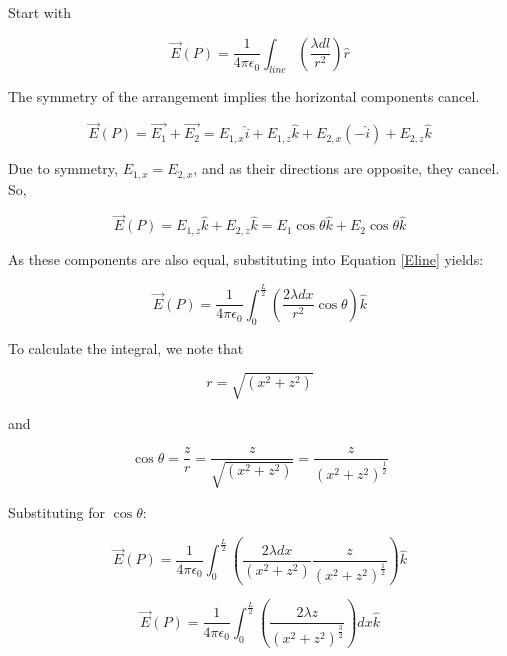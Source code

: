 \documentclass[14pt]{memoir}
\begin{document}
Start with 

\begin{equation}
\vec{E}(P) = \frac{1}{4 \pi \epsilon_0} \int_{line}(\frac{\lambda dl}{r^2})\hat{r}
\label{Eline}
\end{equation}
	
The symmetry of the arrangement implies the horizontal components cancel.

\begin{equation}
\vec{E}(P) = \vec{E_1} + \vec{E_2} = E_{1,x} \hat{i} + E_{1,z} \hat{k} + E_{2,x} (-\hat{i}) + E_{2,z} \hat{k}
\end{equation}

Due to symmetry, $E_{1,x} = E_{2,x}$, and as their directions are opposite, they cancel. So,

\begin{equation}
\vec{E}(P) = E_{1,z} \hat{k}  + E_{2,z} \hat{k} = E_1 \cos{\theta} \hat{k} + E_2 \cos{\theta} \hat{k}
\end{equation}

As these components are also equal, substituting into Equation \ref{Eline} yields:

\begin{equation}
\vec{E}(P) = \frac{1}{4 \pi \epsilon_0} \int_{0}^{\frac{L}{2}}(\frac{2 \lambda dx}{r^2} \cos{\theta})\hat{k}
\end{equation}

To calculate the integral, we note that 

\begin{equation}
r = \sqrt{(x^2 + z ^2)}
\end{equation}

and

\begin{equation}
\cos{\theta} = \frac{z}{r} = \frac{z}{\sqrt{(x^2 + z ^2)}} =  \frac{z}{(x^2 + z ^2)^{\frac{1}{2}}}
\end{equation}

Substituting for $\cos{\theta}$:

\begin{equation}
\vec{E}(P) = \frac{1}{4 \pi \epsilon_0} \int_{0}^{\frac{L}{2}}(\frac{2 \lambda dx}{(x^2 + z ^2)} \frac{z}{(x^2 + z ^2)^{\frac{1}{2}}})\hat{k}
\end{equation}

\begin{equation}
\vec{E}(P) = \frac{1}{4 \pi \epsilon_0} \int_{0}^{\frac{L}{2}}(\frac{2 \lambda z}{(x^2 + z ^2)^{\frac{3}{2}}}) dx \hat{k}
\end{equation}
\end{document}
